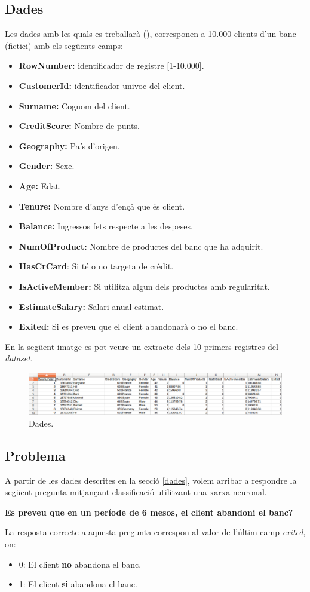 \documentclass[12pt]{article}
\begin{document}
\subsection{Dades\label{dades}}
Les dades amb les quals es treballarà (), corresponen a 10.000 clients d'un banc (fictici) amb els següents camps:
\begin{itemize}
	\item \textbf{RowNumber:} identificador de registre [1-10.000].
	\item \textbf{CustomerId:} identificador univoc del client.
	\item \textbf{Surname:} Cognom del client.
	\item \textbf{CreditScore:} Nombre de punts.
	\item \textbf{Geography:} País d'origen.
	\item \textbf{Gender:} Sexe.
	\item \textbf{Age:} Edat.
	\item \textbf{Tenure:} Nombre d'anys d'ençà que és client.
	\item \textbf{Balance:} Ingressos fets respecte a les despeses.
	\item \textbf{NumOfProduct:} Nombre de productes del banc que ha adquirit.
	\item \textbf{HasCrCard}: Si té o no targeta de crèdit.
	\item \textbf{IsActiveMember:} Si utilitza algun dels productes amb regularitat.
	\item \textbf{EstimateSalary:} Salari anual estimat.
	\item \textbf{Exited:} Si es preveu que el client abandonarà o no el banc.
\end{itemize}
En la següent imatge es pot veure un extracte dels 10 primers registres del \textit{dataset}.
\pagebreak
\begin{figure}[h!]
	\centering
	\includegraphics[scale=0.4]{imatges/dades/dades.png}
	\caption{Dades.}
\end{figure}

\clearpage
\subsection{Problema}
A partir de les dades descrites en la secció \ref{dades}, volem arribar a respondre la següent pregunta mitjançant classificació utilitzant una xarxa neuronal.
\begin{center}
\textbf{Es preveu que en un període de 6 mesos, el client abandoni el banc?}
\end{center}
La resposta correcte a aquesta pregunta correspon al valor de l'últim camp \textit{exited}, on:
\begin{itemize}
	\item 0: El client \textbf{no} abandona el banc.
	\item 1: El client \textbf{si} abandona el banc.
\end{itemize}
\end{document}
